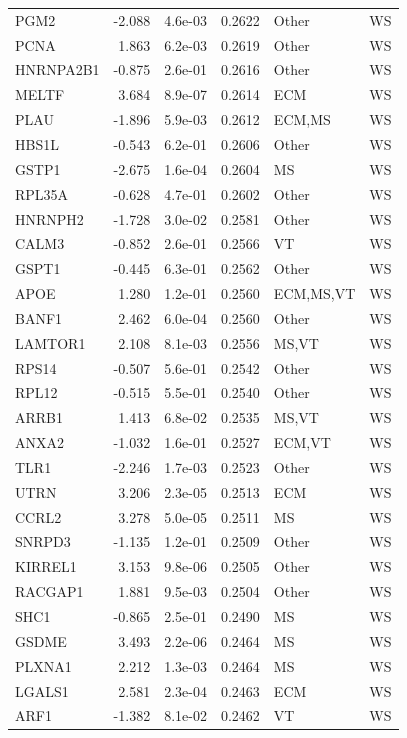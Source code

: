 \begin{table}[ht]
\begin{tabular}{lrlrll}
  PGM2 & -2.088 & 4.6e-03 & 0.2622 & Other & WS \\ 
  PCNA & 1.863 & 6.2e-03 & 0.2619 & Other & WS \\ 
  HNRNPA2B1 & -0.875 & 2.6e-01 & 0.2616 & Other & WS \\ 
  MELTF & 3.684 & 8.9e-07 & 0.2614 & ECM & WS \\ 
  PLAU & -1.896 & 5.9e-03 & 0.2612 & ECM,MS & WS \\ 
  HBS1L & -0.543 & 6.2e-01 & 0.2606 & Other & WS \\ 
  GSTP1 & -2.675 & 1.6e-04 & 0.2604 & MS & WS \\ 
  RPL35A & -0.628 & 4.7e-01 & 0.2602 & Other & WS \\ 
  HNRNPH2 & -1.728 & 3.0e-02 & 0.2581 & Other & WS \\ 
  CALM3 & -0.852 & 2.6e-01 & 0.2566 & VT & WS \\ 
  GSPT1 & -0.445 & 6.3e-01 & 0.2562 & Other & WS \\ 
  APOE & 1.280 & 1.2e-01 & 0.2560 & ECM,MS,VT & WS \\ 
  BANF1 & 2.462 & 6.0e-04 & 0.2560 & Other & WS \\ 
  LAMTOR1 & 2.108 & 8.1e-03 & 0.2556 & MS,VT & WS \\ 
  RPS14 & -0.507 & 5.6e-01 & 0.2542 & Other & WS \\ 
  RPL12 & -0.515 & 5.5e-01 & 0.2540 & Other & WS \\ 
  ARRB1 & 1.413 & 6.8e-02 & 0.2535 & MS,VT & WS \\ 
  ANXA2 & -1.032 & 1.6e-01 & 0.2527 & ECM,VT & WS \\ 
  TLR1 & -2.246 & 1.7e-03 & 0.2523 & Other & WS \\ 
  UTRN & 3.206 & 2.3e-05 & 0.2513 & ECM & WS \\ 
  CCRL2 & 3.278 & 5.0e-05 & 0.2511 & MS & WS \\ 
  SNRPD3 & -1.135 & 1.2e-01 & 0.2509 & Other & WS \\ 
  KIRREL1 & 3.153 & 9.8e-06 & 0.2505 & Other & WS \\ 
  RACGAP1 & 1.881 & 9.5e-03 & 0.2504 & Other & WS \\ 
  SHC1 & -0.865 & 2.5e-01 & 0.2490 & MS & WS \\ 
  GSDME & 3.493 & 2.2e-06 & 0.2464 & MS & WS \\ 
  PLXNA1 & 2.212 & 1.3e-03 & 0.2464 & MS & WS \\ 
  LGALS1 & 2.581 & 2.3e-04 & 0.2463 & ECM & WS \\ 
  ARF1 & -1.382 & 8.1e-02 & 0.2462 & VT & WS \\ 

\end{tabular}
\end{table}

